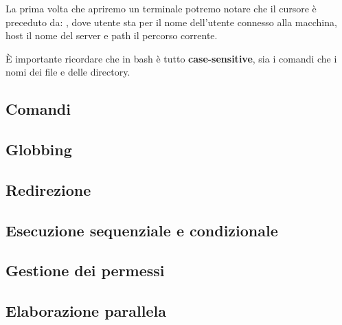 \documentclass[../main.tex]{subfiles}
\begin{document}
La prima volta che apriremo un terminale potremo notare che il cursore è preceduto da: , dove utente sta per il nome dell'utente connesso alla macchina, host il nome del server e path il percorso corrente.

È importante ricordare che in bash è tutto \textbf{case-sensitive}, sia i comandi che i nomi dei file e delle directory.

\subsection{Comandi}


\subsection{Globbing}


\subsection{Redirezione}


\subsection{Esecuzione sequenziale e condizionale}


\pagebreak
\subsection{Gestione dei permessi}


\pagebreak
\subsection{Elaborazione parallela}

\end{document}
